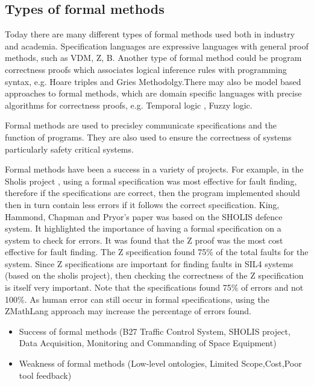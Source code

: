 \subsection{Types of formal methods}
\begin{itemize}

Today there are many different types of formal methods used both in industry and academia. Specification languages are expressive languages with general proof methods, such as VDM, Z, B. Another type of formal method could be program correctness proofs which associates logical inference rules with programming syntax, e.g. Hoare triples and Gries Methodolgy.There may also be model based approaches to formal methods, which are domain specific languages with precise algorithms for correctness proofs, e.g. Temporal logic \cite{uwa}, Fuzzy logic.  

Formal methods are used to precisley communicate specifications and the function of programs. They are also used to ensure the correctness of systems particularly safety critical systems.

Formal methods have been a success in a variety of projects. For example, in the Sholis project \cite{sholis}, using a formal specification was most effective for fault finding, therefore if the specifications are correct, then the program implemented should then in turn contain less errors if it follows the correct specification.
King, Hammond, Chapman and Pryor's paper \cite{sholis} was based on the SHOLIS defence system. It highlighted the importance of having a formal specification on a system to check for errors. It was found that the Z proof was the most cost effective for fault finding. The Z specification found 75\% of the total faults for the system. Since Z specifications are important for finding faults in SIL4 systems (based on the sholis project), then checking the correctness of the Z specification is itself very important. Note that the specifications found 75\% of errors and not 100\%. As human error can still occur in formal specifications, using the ZMathLang approach may increase the percentage of errors found.

\begin{itemize}

\item Success of formal methods (B27 Traffic Control System, SHOLIS project, Data Acquisition, Monitoring and Commanding of Space Equipment)

\item Weakness of formal methods (Low-level ontologies, Limited Scope,Cost,Poor tool feedback)


\end{itemize}
\end{itemize}
